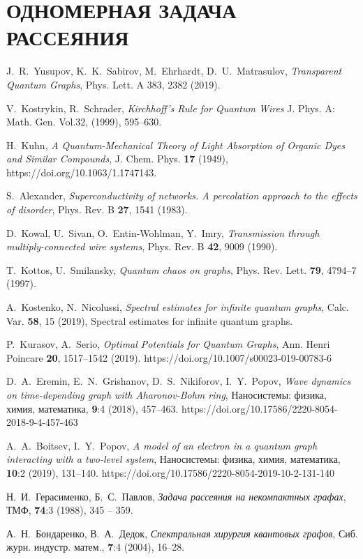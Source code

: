 \documentclass[a4 paper, 12 pt]{extarticle}
\begin{document}
	
	\newpage
	\section{ОДНОМЕРНАЯ ЗАДАЧА РАССЕЯНИЯ}
\newpage
{}
\renewcommand{\refname}{ЛИТЕРАТУРА}
\begin{thebibliography}{1} %
	
	 J.~R.~Yusupov, K.~K.~Sabirov, M.~Ehrhardt, D.~U.~Matrasulov, {\it Transparent Quantum Graphs}, Phys. Lett. A 383, 2382 (2019).
	
	 V.~Kostrykin, R.~Schrader, {\it Kirchhoff's Rule for Quantum Wires} J. Phys. A: Math. Gen. Vol.32, (1999), 595--630.
	
	 H.~Kuhn, {\it A Quantum-Mechanical Theory of Light Absorption of Organic Dyes and Similar Compounds}, J. Chem. Phys. \textbf{17} (1949), https://doi.org/10.1063/1.1747143.
	
	 S.~Alexander, {\it Superconductivity of networks. A percolation approach to the effects of disorder}, Phys. Rev. B \textbf{27}, 1541 (1983).
	
	 D.~Kowal, U.~Sivan, O.~Entin-Wohlman, Y.~Imry, {\it Transmission through multiply-connected wire systems}, Phys. Rev. B \textbf{42}, 9009 (1990).
		
	 T.~Kottos, U.~Smilansky, {\it Quantum chaos on graphs}, Phys. Rev. Lett. \textbf{79}, 4794--7 (1997).
	
	 A.~Kostenko, N.~Nicolussi, {\it Spectral estimates for infinite quantum graphs}, Calc. Var. \textbf{58}, 15 (2019), Spectral estimates for infinite quantum graphs.
	
	  P.~Kurasov, A.~Serio, {\it Optimal Potentials for Quantum Graphs}, Ann. Henri Poincare \textbf{20}, 1517--1542 (2019). https://doi.org/10.1007/s00023-019-00783-6
	
	 D.~A.~Eremin, E.~N.~Grishanov, D.~S.~Nikiforov, I.~Y.~Popov, {\it Wave dynamics on time-depending graph with Aharonov-Bohm ring}, Наносистемы: физика, химия, математика, \textbf{9}:4 (2018), 457--463. https://doi.org/10.17586/2220-8054-2018-9-4-457-463
	
	 A.~A.~Boitsev, I.~Y.~Popov, {\it A model of an electron in a quantum graph interacting with a two-level system}, Наносистемы: физика, химия, математика, \textbf{10}:2 (2019), 131--140. https://doi.org/10.17586/2220-8054-2019-10-2-131-140
	
	 Н.~И.~Герасименко, Б.~С.~Павлов, {\it Задача рассеяния на некомпактных графах}, ТМФ, \textbf{74}:3 (1988), 345 -- 359.
	
	 А.~Н.~Бондаренко, В.~А.~Дедок, {\it Спектральная хирургия квантовых графов}, Сиб. журн. индустр. матем., \textbf{7}:4 (2004), 16--28.

	
\end{thebibliography}
\end{document}
